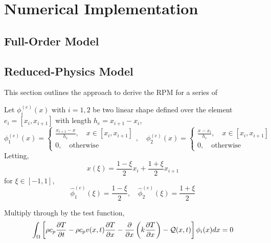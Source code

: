 \appendix

\section{Numerical Implementation}\label{app_implementation}

\subsection{Full-Order Model}

\subsection{Reduced-Physics Model}

This section outlines the approach to derive the RPM for a series of 

Let $\phi^{(e)}_i(x)$ with $i=1,2$ be two linear shape defined over the element $e_i=[x_{i},x_{i+1}]$ with length $h_e=x_{i+1} - x_i$,
\begin{equation}
    \phi^{(e)}_1(x) = \left\{\begin{matrix}
        \frac{x_{i+1} - x}{h_e},\quad x\in[x_i,x_{i+1}]\\
        0, \quad \text{otherwise}
    \end{matrix}\right.,\quad\phi^{(e)}_2(x) = \left\{\begin{matrix}
        \frac{x - x_i}{h_e},\quad x\in[x_i,x_{i+1}]\\
        0, \quad \text{otherwise}
    \end{matrix}\right.
\end{equation}
Letting,
\[
    x(\xi) = \frac{1-\xi}{2}x_i + \frac{1 + \xi}{2}x_{i+1}
\]
for $\xi\in[-1,1]$,
\begin{equation}
    \hat{\phi}_1^{(e)}(\xi) = \frac{1 - \xi}{2},\quad \hat{\phi}_2^{(e)}(\xi) = \frac{1 + \xi}{2}
\end{equation}

Multiply through by the test function,
\begin{equation}
    \int_{\Omega}\left[\rho c_p\frac{\partial T}{\partial t} - \rho c_p v(x,t)\frac{\partial T}{\partial x} - \frac{\partial}{\partial x}\left(k\frac{\partial T}{\partial x}\right) - \mathcal{Q}(x,t)\right]\phi_i(x)dx = 0
\end{equation}

